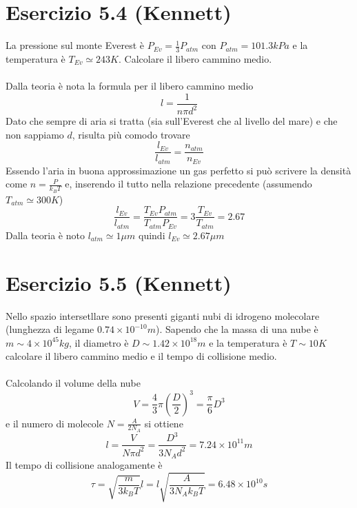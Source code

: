 \documentclass[a4paper]{article}
\begin{document}
    \section*{Esercizio 5.4 (Kennett)}
        La pressione sul monte Everest è $P_{Ev}=\frac{1}{3}P_{atm}$ con $P_{atm}=101.3kPa$ e la temperatura è $T_{Ev}\simeq 243K$.
        Calcolare il libero cammino medio.
        \\
        \\
        Dalla teoria è nota la formula per il libero cammino medio
        \begin{equation*}
            l=\frac{1}{n\pi d^2}
        \end{equation*}
        Dato che sempre di aria si tratta (sia sull'Everest che al livello del mare) e che non sappiamo $d$, risulta più comodo trovare
        \begin{equation*}
            \frac{l_{Ev}}{l_{atm}}=\frac{n_{atm}}{n_{Ev}}
        \end{equation*}
        Essendo l'aria in buona approssimazione un gas perfetto si può scrivere la densità come $n=\frac{P}{k_BT}$ e, inserendo il tutto nella relazione precedente (assumendo $T_{atm}\simeq300K$)
        \begin{equation*}
            \frac{l_{Ev}}{l_{atm}}=\frac{T_{Ev}P_{atm}}{T_{atm}P_{Ev}}=3\frac{T_{Ev}}{T_{atm}}=2.67
        \end{equation*}
        Dalla teoria è noto $l_{atm}\simeq 1\mu m$ quindi $l_{Ev}\simeq 2.67\mu m$

    \section*{Esercizio 5.5 (Kennett)}
        Nello spazio intersetllare sono presenti giganti nubi di idrogeno molecolare (lunghezza di legame $0.74\times 10^{-10}m$).
        Sapendo che la massa di una nube è $m\sim 4\times 10^{45}kg$, il diametro è $D\sim 1.42\times 10^{18}m$ e la temperatura è $T\sim 10K$ calcolare il libero cammino medio e il tempo di collisione medio.
        \\
        \\
        Calcolando il volume della nube
        \begin{equation*}
            V=\frac{4}{3}\pi\left(\frac{D}{2}\right)^3=\frac{\pi}{6}D^3
        \end{equation*}
        e il numero di molecole $N=\frac{A}{2N_A}$ si ottiene
        \begin{equation*}
            l=\frac{V}{N\pi d^2}=\frac{D^3}{3N_Ad^2}=7.24\times 10^{11}m
        \end{equation*}
        Il tempo di collisione analogamente è
        \begin{equation*}
            \tau=\sqrt{\frac{m}{3k_BT}}l=l\sqrt{\frac{A}{3N_Ak_BT}}=6.48\times 10^{10}s
        \end{equation*}
\end{document}
